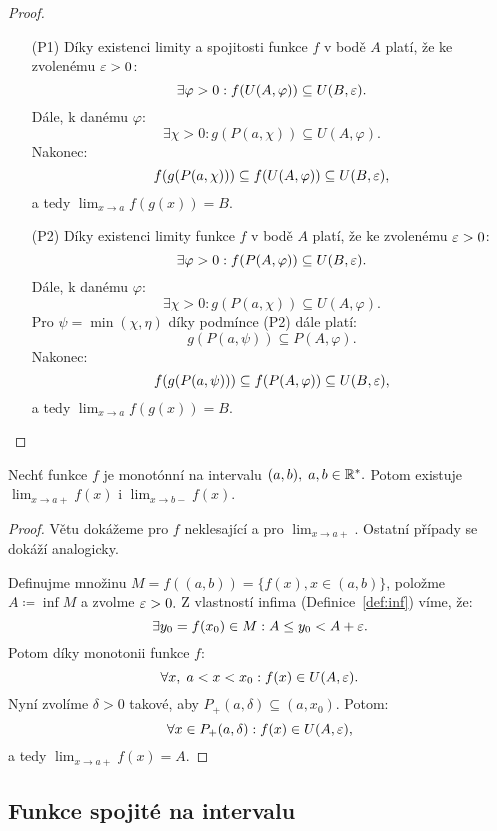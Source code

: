 \begin{proof}
    \leavevmode
    \begin{itemize}
        \item[(P1)] Díky existenci limity a spojitosti funkce $f$ v bodě $A$ 
            platí, že ke zvolenému $\varepsilon > 0$:
            $$\exists \varphi > 0: f(U(A,\varphi)) \subseteq U(B,\varepsilon).$$
            Dále, k danému $\varphi$:
            $$\exists \chi > 0: g(P(a, \chi)) \subseteq U(A,\varphi).$$
            Nakonec:
            $$f(g(P(a, \chi))) \subseteq f(U(A, \varphi)) \subseteq U(B,\varepsilon),$$
            a tedy $\lim_{x \to a} f(g(x)) = B.$
        \item[(P2)]Díky existenci limity funkce $f$ v bodě $A$ 
            platí, že ke zvolenému $\varepsilon > 0$:
            $$\exists \varphi > 0: f(P(A,\varphi)) \subseteq U(B,\varepsilon).$$
            Dále, k danému $\varphi$:
            $$\exists \chi > 0: g(P(a, \chi)) \subseteq U(A,\varphi).$$
            Pro $\psi = \min(\chi, \eta)$ díky podmínce (P2) dále platí:
            $$g(P(a, \psi)) \subseteq P(A,\varphi).$$
            Nakonec:
            $$f(g(P(a, \psi))) \subseteq f(P(A, \varphi)) \subseteq U(B,\varepsilon),$$
            a tedy $\lim_{x \to a} f(g(x)) = B.$
    \end{itemize}
\end{proof}

\begin{theorem}
    \label{th:limitamonotonnifce}
    Nechť funkce $f$ je monotónní na intervalu $(a,b), \; a,b \in \mathbb{R}^*.$
    Potom existuje $\lim_{x \to a+} f(x)$ i $\lim_{x \to b-} f(x).$
\end{theorem}

\begin{proof}
    Větu dokážeme pro $f$ neklesající a pro $\lim_{x \to a+}.$ 
    Ostatní případy se dokáží analogicky.

    Definujme množinu $M = f((a,b)) = \{f(x), x \in (a,b)\}$, položme
    $A \coloneqq \inf M$ a zvolme $\varepsilon > 0.$ Z vlastností infima 
    (Definice~\ref{def:inf}) víme, že:
    $$\exists y_0 = f(x_0) \in M: A \leq y_0 < A + \varepsilon.$$
    Potom díky monotonii funkce $f$:
    $$\forall x, \; a < x < x_0: f(x) \in U(A,\varepsilon).$$
    Nyní zvolíme $\delta > 0$ takové, aby $P_+(a,\delta) \subseteq (a,x_0).$
    Potom:
    $$\forall x \in P_+(a,\delta): f(x) \in U(A,\varepsilon),$$
    a tedy $\lim_{x \to a+} f(x) = A.$
\end{proof}

\subsection{Funkce spojité na intervalu}

